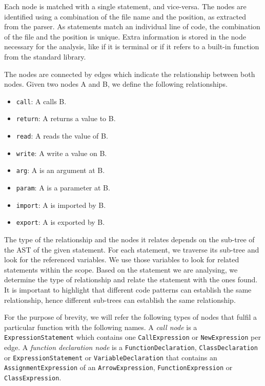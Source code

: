 \documentclass{uvamscse}
\begin{document}
Each node is matched with a single statement, and vice-versa. The nodes are identified using a combination of the file name and the position, as extracted from the parser. As statements match an individual line of code, the combination of the file and the position is unique. Extra information is stored in the node necessary for the analysis, like if it is terminal or if it refers to a built-in function from the standard library.

The nodes are connected by edges which indicate the relationship between both nodes. Given two nodes A and B, we define the following relationships.
\begin{itemize}
    \item \texttt{call}: A calls B.
    \item \texttt{return}: A returns a value to B.
    \item \texttt{read}: A reads the value of B.
    \item \texttt{write}: A write a value on B.
    \item \texttt{arg}: A is an argument at B.
    \item \texttt{param}: A is a parameter at B.
    \item \texttt{import}: A is imported by B.
    \item \texttt{export}: A is exported by B.
\end{itemize}
The type of the relationship and the nodes it relates depends on the sub-tree of the AST of the given statement. For each statement, we traverse its sub-tree and look for the referenced variables. We use those variables to look for related statements within the scope. Based on the statement we are analysing, we determine the type of relationship and relate the statement with the ones found. It is important to highlight that different code patterns can establish the same relationship, hence different sub-trees can establish the same relationship.

For the purpose of brevity, we will refer the following types of nodes that fulfil a particular function with the following names. A \textit{call node} is a \texttt{ExpressionStatement} which contains one \texttt{CallExpression} or \texttt{NewExpression} per edge. A \textit{function declaration node} is a \texttt{FunctionDeclaration}, \texttt{ClassDeclaration} or \texttt{ExpressionStatement} or \texttt{VariableDeclaration} that contains an \texttt{AssignmentExpression} of an \texttt{ArrowExpression}, \texttt{FunctionExpression} or \texttt{ClassExpression}.
\end{document}
